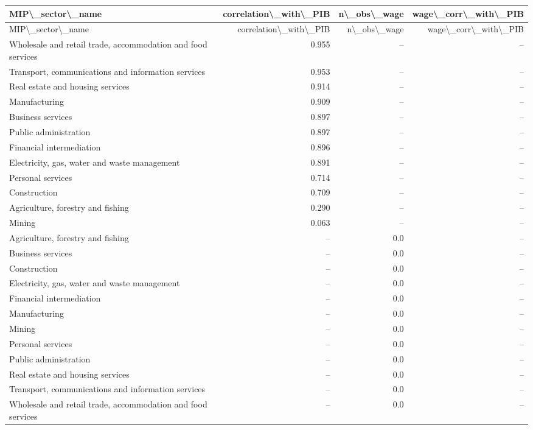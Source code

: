 \begin{longtable}{lrrr}
\hline
MIP\textbackslash{}_sector\textbackslash{}_name & correlation\textbackslash{}_with\textbackslash{}_PIB & n\textbackslash{}_obs\textbackslash{}_wage & wage\textbackslash{}_corr\textbackslash{}_with\textbackslash{}_PIB \\ 
\hline\endfirsthead
\hline
MIP\textbackslash{}_sector\textbackslash{}_name & correlation\textbackslash{}_with\textbackslash{}_PIB & n\textbackslash{}_obs\textbackslash{}_wage & wage\textbackslash{}_corr\textbackslash{}_with\textbackslash{}_PIB \\ 
\hline\endhead
Wholesale and retail trade, accommodation and food services & 0.955 & -- & -- \\ 
Transport, communications and information services & 0.953 & -- & -- \\ 
Real estate and housing services & 0.914 & -- & -- \\ 
Manufacturing & 0.909 & -- & -- \\ 
Business services & 0.897 & -- & -- \\ 
Public administration & 0.897 & -- & -- \\ 
Financial intermediation & 0.896 & -- & -- \\ 
Electricity, gas, water and waste management & 0.891 & -- & -- \\ 
Personal services & 0.714 & -- & -- \\ 
Construction & 0.709 & -- & -- \\ 
Agriculture, forestry and fishing & 0.290 & -- & -- \\ 
Mining & 0.063 & -- & -- \\ 
Agriculture, forestry and fishing & -- & 0.0 & -- \\ 
Business services & -- & 0.0 & -- \\ 
Construction & -- & 0.0 & -- \\ 
Electricity, gas, water and waste management & -- & 0.0 & -- \\ 
Financial intermediation & -- & 0.0 & -- \\ 
Manufacturing & -- & 0.0 & -- \\ 
Mining & -- & 0.0 & -- \\ 
Personal services & -- & 0.0 & -- \\ 
Public administration & -- & 0.0 & -- \\ 
Real estate and housing services & -- & 0.0 & -- \\ 
Transport, communications and information services & -- & 0.0 & -- \\ 
Wholesale and retail trade, accommodation and food services & -- & 0.0 & -- \\ 
\hline
\end{longtable}

